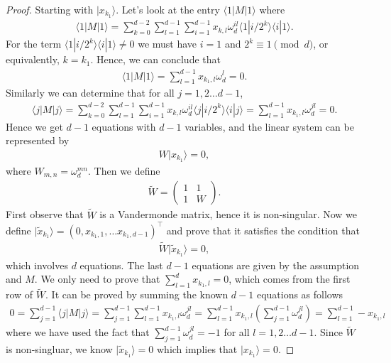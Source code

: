 \documentclass[11pt,letterpaper]{article}
\newcommand{\ket}[1]{|#1\rangle}
\newcommand{\bra}[1]{\langle#1|}
\newcommand{\braket}[2]{\langle#1|#2\rangle}
\newcommand{\1}{\mathbb{1}}
\newcommand{\tW}{\tilde{W}}
\newcommand{\tx}{\tilde{x}}
\theoremstyle{definition}
\begin{document}
\begin{proof}
Starting with $\ket{x_{k_1}}$.
Let's look at the entry $\bra{1}M\ket{1}$ where 
\begin{align}
	\bra{1}M\ket{1} = \sum_{k=0}^{d-2}\sum_{l = 1}^{d-1}\sum_{i=1}^{d-1} x_{k, l}\omega_d^{il}\braket{1}{i/2^k}\braket{i}{1}.
\end{align}
For the term $\braket{1}{i/2^k}\braket{i}{1} \neq 0$ we must have $i = 1$ and $2^k \equiv 1 \pmod{d}$, or equivalently,
$k = k_1$. Hence, we can conclude that 
\begin{align}
	\bra{1}M\ket{1} = \sum_{l = 1}^{d-1} x_{k_1,l}\omega_d^l = 0. 
\end{align}
Similarly we can determine that for all $j = 1,2\dots d-1$,
\begin{align}
	\bra{j}M\ket{j} 
	=  \sum_{k=0}^{d-2}\sum_{l = 1}^{d-1}\sum_{i=1}^{d-1} x_{k, l}\omega_d^{il}\braket{j}{i/2^k}\braket{i}{j} 
	= \sum_{l = 1}^{d-1}x_{k_1,l}\omega_d^{jl} = 0.
\end{align}
Hence we get $d-1$ equations with $d-1$ variables, and the linear system
can be represented by 
\begin{align}
	W \ket{x_{k_1}} = 0,
\end{align}
where $W_{m,n} = \omega_d^{mn}$. Then we define
\begin{align}
	\tW = 
	\begin{pmatrix}
	1 & 1 \\
	1 & W
	\end{pmatrix}.
\end{align}
First observe that $\tW$ is a Vandermonde matrix, hence it is non-singular.
Now we define $\ket{\tx_{k_1}} = (0, x_{k_1,1}, \dots x_{k_1,d-1})^\intercal$ 
and prove that it satisfies the condition
that 
\begin{align}
	\tW \ket{\tx_{k_1}} = 0,
\end{align}
which involves $d$ equations. The last $d-1$ equations are given by the assumption and $M$.
We only need to prove that $\sum_{l=1}^d x_{k_1, l} = 0$, which comes from the first row of $\tW$.
It can be proved by summing the known $d-1$ equations as follows
\begin{align}
	0=\sum_{j = 1}^{d-1} \bra{j}M\ket{j}  
	=  \sum_{j=1}^{d-1}\sum_{l = 1}^{d-1}x_{k_1,l}\omega_d^{jl}
	=\sum_{l = 1}^{d-1}x_{k_1,l} (\sum_{j=1}^{d-1} \omega_d^{jl})
	= \sum_{l = 1}^{d-1}- x_{k_1,l}
\end{align}
where we have used the fact that $\sum_{j=1}^{d-1} \omega_d^{jl} =-1$ for all $l = 1,2\dots d-1$.
Since $\tW$ is non-singluar, we know $\ket{\tx_{k_1}} = 0$ which implies that $\ket{x_{k_1}} = 0$.


\end{proof}
\end{document}
